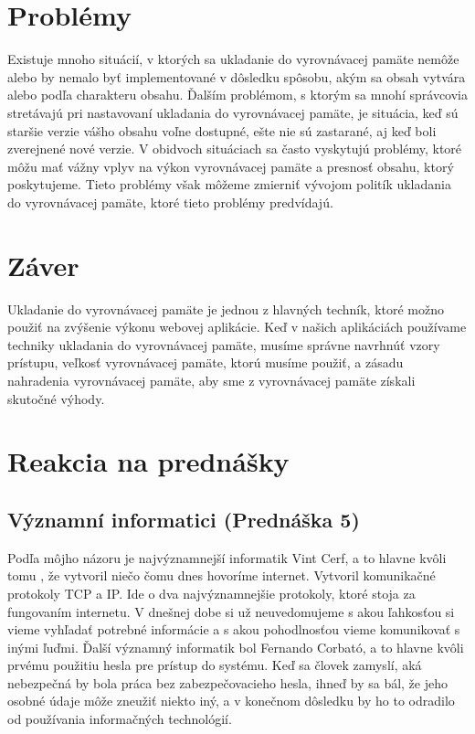 \documentclass[10pt,oneside,slovak,a4paper]{article}
\begin{document}
\section{Problémy}
\quad
Existuje mnoho situácií, v ktorých sa ukladanie do vyrovnávacej pamäte nemôže alebo by nemalo byť implementované v dôsledku spôsobu, akým sa obsah vytvára  alebo podľa charakteru obsahu. Ďalším problémom, s ktorým sa mnohí správcovia stretávajú pri nastavovaní ukladania do vyrovnávacej pamäte, je situácia, keď sú staršie verzie \cite{IEEE}vášho obsahu voľne dostupné, ešte nie sú zastarané, aj keď boli zverejnené nové verzie. V obidvoch situáciach sa často vyskytujú problémy, ktoré môžu mať vážny vplyv na výkon vyrovnávacej pamäte a presnosť obsahu, ktorý poskytujeme. Tieto problémy však môžeme zmierniť vývojom politík ukladania do vyrovnávacej pamäte, ktoré tieto problémy predvídajú.


\section{Záver}
\quad
Ukladanie do vyrovnávacej pamäte je jednou z hlavných techník, ktoré možno použiť na zvýšenie výkonu webovej aplikácie. Keď v našich aplikáciách používame techniky ukladania do vyrovnávacej pamäte, musíme správne navrhnúť vzory prístupu, veľkosť vyrovnávacej pamäte, ktorú musíme použiť, a zásadu nahradenia vyrovnávacej pamäte, aby sme z vyrovnávacej pamäte získali skutočné výhody.



\section{Reakcia na prednášky}


\subsection{Významní informatici (Prednáška 5)}
\quad Podľa môjho názoru je najvýznamnejší informatik Vint Cerf, a to hlavne kvôli tomu , že vytvoril niečo čomu dnes hovoríme internet. Vytvoril komunikačné protokoly TCP a IP. Ide o dva najvýznamnejšie protokoly, ktoré stoja za fungovaním internetu. V dnešnej dobe si už neuvedomujeme  s akou ľahkosťou si vieme vyhľadať potrebné informácie a s akou pohodlnosťou vieme komunikovať s inými ľuďmi. Ďalší významný informatik bol  Fernando Corbató, a to hlavne kvôli prvému použitiu hesla pre prístup do systému. Keď sa človek zamyslí, aká nebezpečná by bola práca bez zabezpečovacieho hesla, ihneď by sa bál, že jeho osobné údaje môže zneužiť niekto iný, a v konečnom dôsledku by ho to odradilo od používania informačných technológií.
\end{document}
